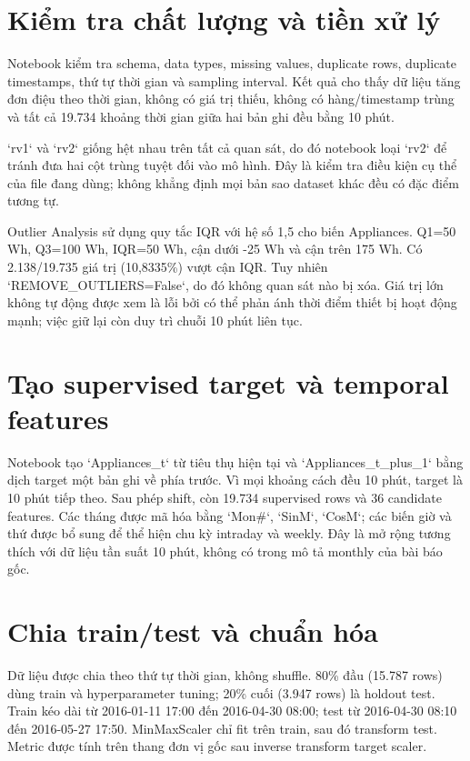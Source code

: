 \section{Kiểm tra chất lượng và tiền xử lý}\label{kiux1ec3m-tra-chux1ea5t-lux1b0ux1ee3ng-vuxe0-tiux1ec1n-xux1eed-luxfd}

Notebook kiểm tra schema, data types, missing values, duplicate rows, duplicate timestamps, thứ tự thời gian và sampling interval. Kết quả cho thấy dữ liệu tăng đơn điệu theo thời gian, không có giá trị thiếu, không có hàng/timestamp trùng và tất cả 19.734 khoảng thời gian giữa hai bản ghi đều bằng 10 phút.

`rv1` và `rv2` giống hệt nhau trên tất cả quan sát, do đó notebook loại `rv2` để tránh đưa hai cột trùng tuyệt đối vào mô hình. Đây là kiểm tra điều kiện cụ thể của file đang dùng; không khẳng định mọi bản sao dataset khác đều có đặc điểm tương tự.

Outlier Analysis sử dụng quy tắc IQR với hệ số 1,5 cho biến Appliances. Q1=50 Wh, Q3=100 Wh, IQR=50 Wh, cận dưới -25 Wh và cận trên 175 Wh. Có 2.138/19.735 giá trị (10,8335\%) vượt cận IQR. Tuy nhiên `REMOVE\_\allowbreak OUTLIERS=False`, do đó không quan sát nào bị xóa. Giá trị lớn không tự động được xem là lỗi bởi có thể phản ánh thời điểm thiết bị hoạt động mạnh; việc giữ lại còn duy trì chuỗi 10 phút liên tục.

\section{Tạo supervised target và temporal features}\label{tux1ea1o-supervised-target-vuxe0-temporal-features}

Notebook tạo `Appliances\_t` từ tiêu thụ hiện tại và `Appliances\_t\_plus\_1` bằng dịch target một bản ghi về phía trước. Vì mọi khoảng cách đều 10 phút, target là 10 phút tiếp theo. Sau phép shift, còn 19.734 supervised rows và 36 candidate features. Các tháng được mã hóa bằng `Mon\#`, `SinM`, `CosM`; các biến giờ và thứ được bổ sung để thể hiện chu kỳ intraday và weekly. Đây là mở rộng tương thích với dữ liệu tần suất 10 phút, không có trong mô tả monthly của bài báo gốc.

\section{Chia train/test và chuẩn hóa}\label{chia-traintest-vuxe0-chuux1ea9n-huxf3a}

Dữ liệu được chia theo thứ tự thời gian, không shuffle. 80\% đầu (15.787 rows) dùng train và hyperparameter tuning; 20\% cuối (3.947 rows) là holdout test. Train kéo dài từ 2016-01-11 17:00 đến 2016-04-30 08:00; test từ 2016-04-30 08:10 đến 2016-05-27 17:50. MinMaxScaler chỉ fit trên train, sau đó transform test. Metric được tính trên thang đơn vị gốc sau inverse transform target scaler.

